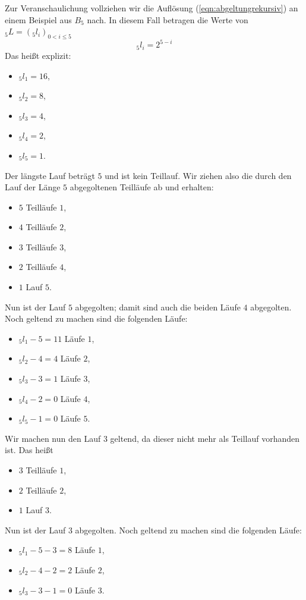 \documentclass[11pt,a4paper]{scrartcl}
\theoremstyle{plain}
\theoremstyle{definition}
\theoremstyle{remark}
\begin{document}
Zur Veranschaulichung vollziehen wir die Auflösung
(\ref{eqn:abgeltungrekursiv}) an einem Beispiel aus $B_5$ nach. In diesem
Fall betragen die Werte von $_5L=(_5l_i)_{0<i\leq5}$
\begin{equation}
  _5l_i=2^{5-i}
\end{equation}
Das heißt explizit:
\begin{itemize}
  \item $_5l_1=16$,
  \item $_5l_2=8$,
  \item $_5l_3=4$,
  \item $_5l_4=2$,
  \item $_5l_5=1$.
\end{itemize}
Der längste Lauf beträgt $5$ und ist kein Teillauf. Wir ziehen also
die durch den Lauf der Länge $5$ abgegoltenen Teilläufe ab und
erhalten:
\begin{itemize}
  \item $5$ Teilläufe $1$,
  \item $4$ Teilläufe $2$,
  \item $3$ Teilläufe $3$,
  \item $2$ Teilläufe $4$,
  \item $1$ Lauf $5$.
\end{itemize}
Nun ist der Lauf $5$ abgegolten; damit sind auch die beiden Läufe
$4$ abgegolten. Noch
geltend zu machen sind die folgenden Läufe:
\begin{itemize}
  \item $_5l_1-5=11$ Läufe $1$,
  \item $_5l_2-4=4$ Läufe $2$,
  \item $_5l_3-3=1$ Läufe $3$,
  \item $_5l_4-2=0$ Läufe $4$,
  \item $_5l_5-1=0$ Läufe $5$.
\end{itemize}
Wir machen nun den Lauf $3$ geltend, da dieser nicht mehr als
Teillauf vorhanden ist. Das heißt
\begin{itemize}
  \item $3$ Teilläufe $1$,
  \item $2$ Teilläufe $2$,
  \item $1$ Lauf $3$.
\end{itemize}
Nun ist der Lauf $3$ abgegolten. Noch geltend zu machen sind die
folgenden Läufe:
\begin{itemize}
  \item $_5l_1-5-3=8$ Läufe $1$,
  \item $_5l_2-4-2=2$ Läufe $2$,
  \item $_5l_3-3-1=0$ Läufe $3$.
\end{itemize}
\end{document}
